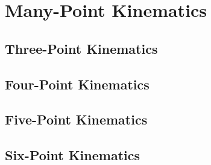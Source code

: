 \documentclass[letterpaper, 12pt]{report}
\begin{document}
\part{Many-Point Kinematics}

\chapter{Three-Point Kinematics}
\chapter{Four-Point Kinematics}
\chapter{Five-Point Kinematics}
\chapter{Six-Point Kinematics}
\end{document}
